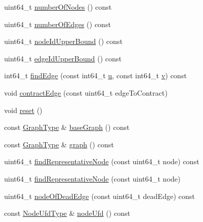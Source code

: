 \begin{DoxyCompactItemize}
uint64\+\_\+t \hyperlink{classnifty_1_1graph_1_1EdgeContractionGraph_add06772035f2b62cabd4d1887a2101e6}{number\+Of\+Nodes} () const
\item 
uint64\+\_\+t \hyperlink{classnifty_1_1graph_1_1EdgeContractionGraph_ad62c0b6483f0470dfe4d9af2f273d07a}{number\+Of\+Edges} () const
\item 
uint64\+\_\+t \hyperlink{classnifty_1_1graph_1_1EdgeContractionGraph_aecd45b340dbfb2774c48ab06cb083995}{node\+Id\+Upper\+Bound} () const
\item 
uint64\+\_\+t \hyperlink{classnifty_1_1graph_1_1EdgeContractionGraph_a8da285e18584fd0f4b95e3293f985ec2}{edge\+Id\+Upper\+Bound} () const
\item 
int64\+\_\+t \hyperlink{classnifty_1_1graph_1_1EdgeContractionGraph_a9764dfe9d4d1b67cc9bd4dd34567dd9d}{find\+Edge} (const int64\+\_\+t \hyperlink{classnifty_1_1graph_1_1EdgeContractionGraph_abcf5091cb2fa0a7ebf70461670f6adc6}{u}, const int64\+\_\+t \hyperlink{classnifty_1_1graph_1_1EdgeContractionGraph_a454f1714ad453fc12af7b688e1a65083}{v}) const
\item 
void \hyperlink{classnifty_1_1graph_1_1EdgeContractionGraph_ad13498d6f4fd9e360fa8884febaeba0a}{contract\+Edge} (const uint64\+\_\+t edge\+To\+Contract)
\item 
void \hyperlink{classnifty_1_1graph_1_1EdgeContractionGraph_a76a6e084c4dfe14a20f5671ec5f57cbc}{reset} ()
\item 
const \hyperlink{classnifty_1_1graph_1_1EdgeContractionGraph_a67f653761dbc2c203891b041aacc3f04}{Graph\+Type} \& \hyperlink{classnifty_1_1graph_1_1EdgeContractionGraph_a4a3b76832b977d03e8507b47a7f1b0ae}{base\+Graph} () const
\item 
const \hyperlink{classnifty_1_1graph_1_1EdgeContractionGraph_a67f653761dbc2c203891b041aacc3f04}{Graph\+Type} \& \hyperlink{classnifty_1_1graph_1_1EdgeContractionGraph_a422ab3344774fa68583658effa1fca95}{graph} () const
\item 
uint64\+\_\+t \hyperlink{classnifty_1_1graph_1_1EdgeContractionGraph_ab0e210c9cc2f7634ad7ed51bca81a6da}{find\+Representative\+Node} (const uint64\+\_\+t node) const
\item 
uint64\+\_\+t \hyperlink{classnifty_1_1graph_1_1EdgeContractionGraph_a96db6fdacf91e9f67d505f1bfc33ef76}{find\+Representative\+Node} (const uint64\+\_\+t node)
\item 
uint64\+\_\+t \hyperlink{classnifty_1_1graph_1_1EdgeContractionGraph_a6538334aa0d9cd0fc95bc197f73228bd}{node\+Of\+Dead\+Edge} (const uint64\+\_\+t dead\+Edge) const
\item 
const \hyperlink{classnifty_1_1graph_1_1EdgeContractionGraph_a7ff98238621f4b534e89b1880ee77239}{Node\+Ufd\+Type} \& \hyperlink{classnifty_1_1graph_1_1EdgeContractionGraph_a3485f0d1574e28e96aab43d5e0b8c4c0}{node\+Ufd} () const
\end{DoxyCompactItemize}


